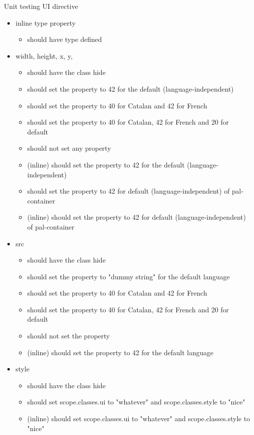 Unit testing UI directive
\begin{itemize}
	\item inline type property
		\begin{itemize}
			\item should have type defined
		\end{itemize}
	\item width, height, x, y, 
		\begin{itemize}
			\item should have the class hide
			\item should set the property to 42 for the default (language-independent)
			\item should set the property to 40 for Catalan and 42 for French
			\item should set the property to 40 for Catalan, 42 for French and 20 for default
			\item should not set any property
			\item (inline) should set the property to 42 for the default (language-independent)
			\item should set the property to 42 for default (language-independent) of pal-container
			\item (inline) should set the property to 42 for default (language-independent) of pal-container 
		\end{itemize}
	\item src
		\begin{itemize}
			\item should have the class hide
    		\item should set the property to "dummy string" for the default language
    		\item should set the property to 40 for Catalan and 42 for French
    		\item should set the property to 40 for Catalan, 42 for French and 20 for default
    		\item should not set the property
    		\item (inline) should set the property to 42 for the default language
		\end{itemize}
	\item style
		\begin{itemize}
			\item should have the class hide
			\item should set scope.classes.ui to "whatever" and scope.classes.style to "nice"
			\item (inline) should set scope.classes.ui to "whatever" and scope.classes.style to "nice"

\end{itemize}
\end{itemize}
